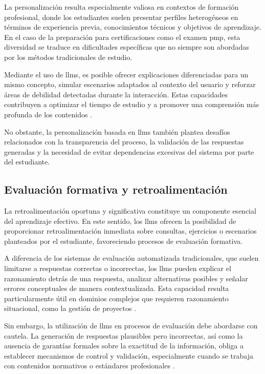 La personalización resulta especialmente valiosa en contextos de formación profesional, donde los estudiantes suelen presentar perfiles heterogéneos en términos de experiencia previa, conocimientos técnicos y objetivos de aprendizaje. En el caso de la preparación para certificaciones como el examen \gls{pmp}, esta diversidad se traduce en dificultades específicas que no siempre son abordadas por los métodos tradicionales de estudio.

Mediante el uso de \glspl{llm}, es posible ofrecer explicaciones diferenciadas para un mismo concepto, simular escenarios adaptados al contexto del usuario y reforzar áreas de debilidad detectadas durante la interacción. Estas capacidades contribuyen a optimizar el tiempo de estudio y a promover una comprensión más profunda de los contenidos \parencite{deng2024chatgpt}.

No obstante, la personalización basada en \glspl{llm} también plantea desafíos relacionados con la transparencia del proceso, la validación de las respuestas generadas y la necesidad de evitar dependencias excesivas del sistema por parte del estudiante.

\subsection{Evaluación formativa y retroalimentación}

La retroalimentación oportuna y significativa constituye un componente esencial del aprendizaje efectivo. En este sentido, los \glspl{llm} ofrecen la posibilidad de proporcionar retroalimentación inmediata sobre consultas, ejercicios o escenarios planteados por el estudiante, favoreciendo procesos de evaluación formativa.

A diferencia de los sistemas de evaluación automatizada tradicionales, que suelen limitarse a respuestas correctas o incorrectas, los \glspl{llm} pueden explicar el razonamiento detrás de una respuesta, analizar alternativas posibles y señalar errores conceptuales de manera contextualizada. Esta capacidad resulta particularmente útil en dominios complejos que requieren razonamiento situacional, como la gestión de proyectos \parencite{kasneci2023chatgpt}.

Sin embargo, la utilización de \glspl{llm} en procesos de evaluación debe abordarse con cautela. La generación de respuestas plausibles pero incorrectas, así como la ausencia de garantías formales sobre la exactitud de la información, obliga a establecer mecanismos de control y validación, especialmente cuando se trabaja con contenidos normativos o estándares profesionales \parencite{huang2024hallucination}.

